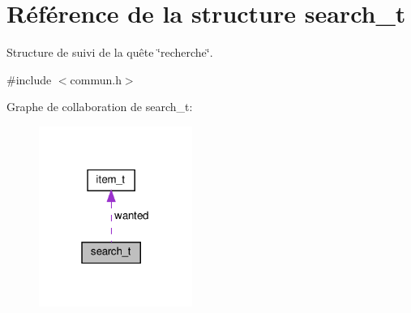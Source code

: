 \hypertarget{structsearch__t}{}\section{Référence de la structure search\+\_\+t}
\label{structsearch__t}


Structure de suivi de la quête \char`\"{}recherche\char`\"{}.  




{\ttfamily \#include $<$commun.\+h$>$}



Graphe de collaboration de search\+\_\+t\+:\nopagebreak
\begin{figure}[H]
\begin{center}
\leavevmode
\includegraphics[width=142pt]{structsearch__t__coll__graph}
\end{center}
\end{figure}

